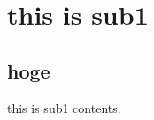 \documentclass[master.tex]{subfiles}
\begin{document}
\chapter{this is sub1\label{sub1}}
\section{hoge}\label{sub1}
this is sub1 contents.
\end{document}
